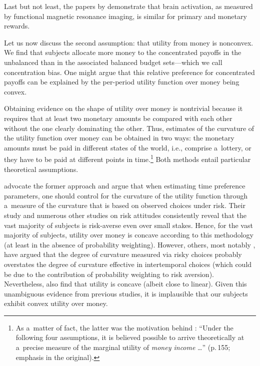 Last but not least, the papers by \cite{McClure2004a, McClure2007} demonstrate that brain activation, as measured by functional magnetic resonance imaging, is similar for primary and monetary rewards.

Let us now discuss the second assumption: that utility from money is nonconvex. We find that subjects allocate more money to the concentrated payoffs in the unbalanced than in the associated balanced budget sets---which we call concentration bias. One might argue that this relative preference for concentrated payoffs can be explained by the per-period utility function over money being convex.

Obtaining evidence on the shape of utility over money is nontrivial because it requires that at least two monetary amounts be compared with each other without the one clearly dominating the other. Thus, estimates of the curvature of the utility function over money can be obtained in two ways: the monetary amounts must be paid in different states of the world, i.e., comprise a~lottery, or they have to be paid at different points in time.\footnote{As a~matter of fact, the latter was the motivation behind \cite{Samuelson1937}: ``Under the following four assumptions, it is believed possible to arrive theoretically at a~precise measure of the marginal utility of \textit{money income} \dots'' (p.\,155; emphasis in the original).} Both methods entail particular theoretical assumptions.

\cite{Andersen2008} advocate the former approach and argue that when estimating time preference parameters, one should control for the curvature of the utility function through a~measure of the curvature that is based on observed choices under risk. Their study and numerous other studies on risk attitudes consistently reveal that the vast majority of subjects is risk-averse even over small stakes. Hence, for the vast majority of subjects, utility over money is concave according to this methodology (at least in the absence of probability weighting). However, others, most notably \cite{Andreoni2012}, have argued that the degree of curvature measured via risky choices probably overstates the degree of curvature effective in intertemporal choices (which could be due to the contribution of probability weighting to risk aversion). Nevertheless, also \cite{Andreoni2012} find that utility is concave (albeit close to linear). Given this unambiguous evidence from previous studies, it is implausible that our subjects exhibit convex utility over money.